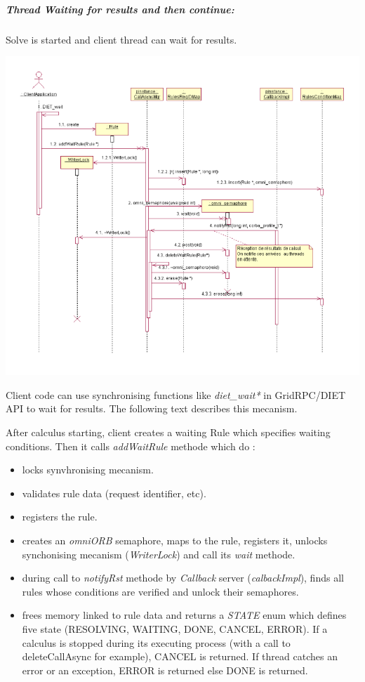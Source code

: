  \vspace{.9 in}

  \subparagraph{Thread Waiting for results and then continue:}
  Solve is started and client thread can wait for results.

  \hspace{-1 in}
  \includegraphics{./fig/CallAsyncWaitSequenceDiagram}

  Client code can use synchronising functions like \emph{diet\_wait*}
  in GridRPC/DIET API to wait for results. The following text describes
  this mecanism.

  After calculus starting, client creates a waiting Rule which specifies
  waiting conditions. Then it calls \emph{addWaitRule} methode which do :

  \begin{itemize}
  \item locks synvhronising mecanism.
  \item validates rule data (request identifier, etc).
  \item registers the rule.
  \item creates an \emph{omniORB}  semaphore, maps to the rule, registers it,
  unlocks synchonising mecanism (\emph{WriterLock}) and call its \emph{wait} methode.
  \item during call to \emph{notifyRst} methode by \emph{Callback} server
  (\emph{calbackImpl}), finds all rules whose conditions are verified
  and unlock their semaphores.
  \item frees memory linked to rule data and returns a \emph{STATE} enum
  which defines five state (RESOLVING, WAITING, DONE, CANCEL, ERROR). If
  a calculus is stopped during its executing process (with a call to deleteCallAsync for example),
  CANCEL is returned. If thread catches an error or an exception, ERROR is returned else DONE is returned.
  \end{itemize}


